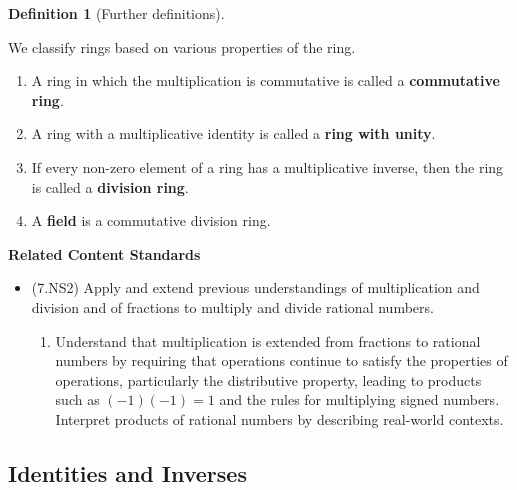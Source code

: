 \documentclass[
]{book}
\providecommand{\tightlist}{%
  \setlength{\itemsep}{0pt}\setlength{\parskip}{0pt}}
\newenvironment{standards}{}{}
\theoremstyle{definition}
\newtheorem{definition}{Definition}[chapter]
\theoremstyle{definition}
\theoremstyle{definition}
\theoremstyle{definition}
\theoremstyle{remark}
\begin{document}
\begin{definition}[Further definitions]
\protect\hypertarget{def:unlabeled-div-93}{}\label{def:unlabeled-div-93}

We classify rings based on various properties of the ring.

\begin{enumerate}
\def\labelenumi{\arabic{enumi}.}
\tightlist
\item
  A ring in which the multiplication is commutative is called a \textbf{commutative ring}.
\item
  A ring with a multiplicative identity is called a \textbf{ring with unity}.
\item
  If every non-zero element of a ring has a multiplicative inverse, then the ring is called a \textbf{division ring}.
\item
  A \textbf{field} is a commutative division ring.
\end{enumerate}

\end{definition}

\begin{standards}

\begin{center}
\textbf{Related Content Standards}

\end{center}

\begin{itemize}
\tightlist
\item
  (7.NS2) Apply and extend previous understandings of multiplication and division and of fractions to multiply and divide rational numbers.

  \begin{enumerate}
  \def\labelenumi{\alph{enumi}.}
  \tightlist
  \item
    Understand that multiplication is extended from fractions to rational numbers by requiring that operations continue to satisfy the properties of operations, particularly the distributive property, leading to products such as \((-1)(-1) = 1\) and the rules for multiplying signed numbers. Interpret products of rational numbers by describing real-world contexts.
  \end{enumerate}
\end{itemize}

\end{standards}

\hypertarget{identities-and-inverses}{%
\subsection{Identities and Inverses}\label{identities-and-inverses}}
\end{document}
